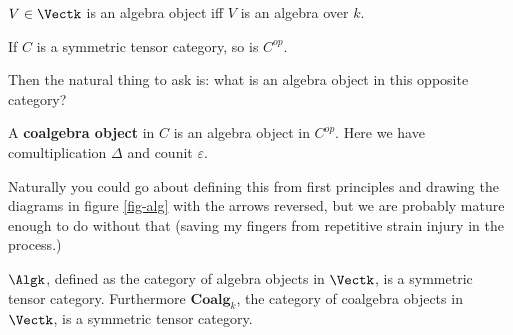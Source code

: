 \documentclass[12pt]{article}
\newcommand*{\Coalgk}{\mathbf{Coalg}_k}
\begin{document}
\begin{lem}
	$V\in\Vectk$ is an algebra object iff $V$ is an algebra over $k$.
\end{lem}

\begin{lem}
	If $C$ is a symmetric tensor category, so is $C^{op}$.
\end{lem}

Then the natural thing to ask is: what is an algebra object in this opposite category?
\begin{defn}
	A \textbf{coalgebra object} in $C$ is an algebra object in $C^{op}$. Here we have 
	comultiplication $\Delta$ and counit $\varepsilon$.
\end{defn}
\begin{rmk}
	Naturally you could go about defining this from first principles and drawing the diagrams
	in figure \ref{fig-alg} with the arrows reversed, but we are probably mature enough
	to do without that (saving my fingers from repetitive strain injury in the process.)
\end{rmk}

\begin{lem}
	$\Algk$, defined as the category of algebra objects in $\Vectk$, is a symmetric tensor category. Furthermore
	$\Coalgk$, the category of coalgebra objects in $\Vectk$, is a symmetric tensor category.
\end{lem}
\end{document}
